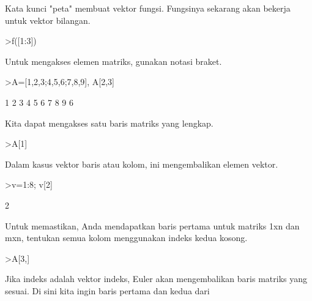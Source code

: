 \documentclass[a4paper,10pt]{article}
\begin{document}
\begin{eulernotebook}
\begin{eulercomment}
\begin{eulercomment}
\begin{eulercomment}
\begin{eulercomment}
\begin{eulercomment}
Kata kunci "peta" membuat vektor fungsi. Fungsinya sekarang akan
bekerja untuk vektor bilangan.
\end{eulercomment}
\begin{eulerprompt}
>f([1:3])
\end{eulerprompt}
\begin{euleroutput}
  [0,  2.05045,  13.7251]
\end{euleroutput}
\begin{eulercomment}
Untuk mengakses elemen matriks, gunakan notasi braket.
\end{eulercomment}
\begin{eulerprompt}
>A=[1,2,3;4,5,6;7,8,9], A[2,3]
\end{eulerprompt}
\begin{euleroutput}
              1             2             3 
              4             5             6 
              7             8             9 
  6
\end{euleroutput}
\begin{eulercomment}
Kita dapat mengakses satu baris matriks yang lengkap.
\end{eulercomment}
\begin{eulerprompt}
>A[1]
\end{eulerprompt}
\begin{euleroutput}
  [1,  2,  3]
\end{euleroutput}
\begin{eulercomment}
Dalam kasus vektor baris atau kolom, ini mengembalikan elemen vektor.
\end{eulercomment}
\begin{eulerprompt}
>v=1:8; v[2]
\end{eulerprompt}
\begin{euleroutput}
  2
\end{euleroutput}
\begin{eulercomment}
Untuk memastikan, Anda mendapatkan baris pertama untuk matriks 1xn dan
mxn, tentukan semua kolom menggunakan indeks kedua kosong.
\end{eulercomment}
\begin{eulerprompt}
>A[3,]
\end{eulerprompt}
\begin{euleroutput}
  [7,  8,  9]
\end{euleroutput}
\begin{eulercomment}
Jika indeks adalah vektor indeks, Euler akan mengembalikan baris
matriks yang sesuai. Di sini kita ingin baris pertama dan kedua dari

\end{eulercomment}
\end{eulercomment}
\end{eulercomment}
\end{eulercomment}
\end{eulercomment}
\end{eulernotebook}
\end{document}
